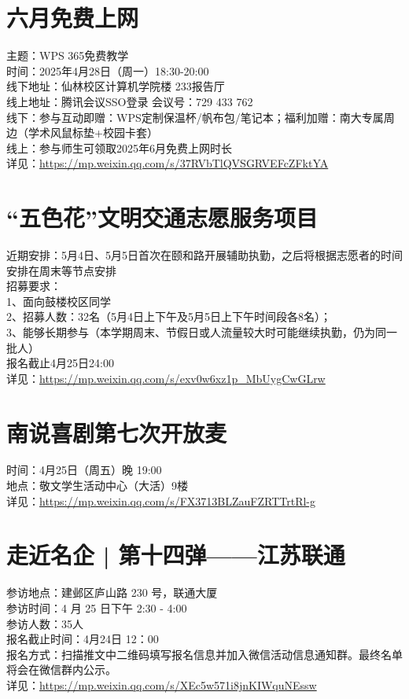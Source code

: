 \documentclass[letterpaper, 12pt]{article}
\begin{document}
\begin{multicols}{2}
\section{六月免费上网} %
主题：WPS 365免费教学
\\时间：2025年4月28日（周一）18:30-20:00
\\线下地址：仙林校区计算机学院楼 233报告厅
\\线上地址：腾讯会议SSO登录 会议号：729 433 762
\\线下：参与互动即赠：WPS定制保温杯/帆布包/笔记本；福利加赠：南大专属周边（学术风鼠标垫+校园卡套）
\\线上：参与师生可领取2025年6月免费上网时长
\\详见：\url{https://mp.weixin.qq.com/s/37RVbTlQVSGRVEFcZFktYA}

\section{“五色花”文明交通志愿服务项目} %
近期安排：5月4日、5月5日首次在颐和路开展辅助执勤，之后将根据志愿者的时间安排在周末等节点安排
\\招募要求：
\\1、面向鼓楼校区同学
\\2、招募人数：32名（5月4日上下午及5月5日上下午时间段各8名）；
\\3、能够长期参与（本学期周末、节假日或人流量较大时可能继续执勤，仍为同一批人）
\\报名截止4月25日24:00
\\详见：\url{https://mp.weixin.qq.com/s/exv0w6xz1p_MbUygCwGLrw}

\section{南说喜剧第七次开放麦} %
时间：4月25日（周五）晚 19:00
\\地点：敬文学生活动中心（大活）9楼
\\详见：\url{https://mp.weixin.qq.com/s/FX3713BLZauFZRTTrtRl-g}

\section{走近名企 | 第十四弹——江苏联通} %
参访地点：建邺区庐山路 230 号，联通大厦
\\参访时间：4 月 25 日下午 2:30 - 4:00
\\参访人数：35人
\\报名截止时间：4月24日 12：00
\\报名方式：扫描推文中二维码填写报名信息并加入微信活动信息通知群。最终名单将会在微信群内公示。
\\详见：\url{https://mp.weixin.qq.com/s/XEc5w571i8jnKIWquNEssw}

\end{multicols}
\end{document}
